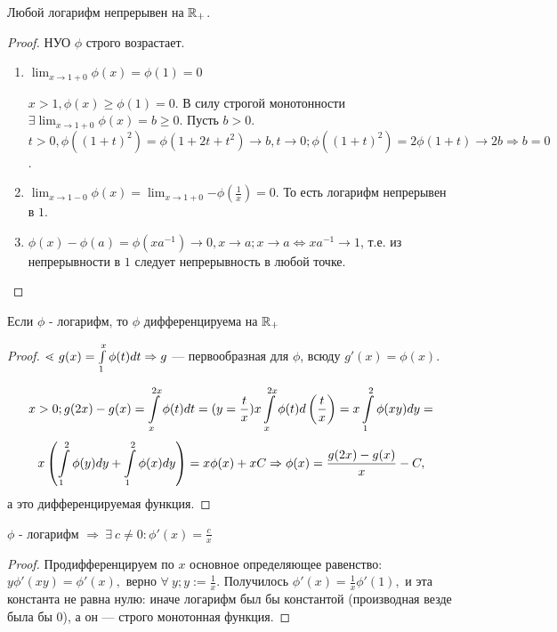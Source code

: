 \documentclass[12pt]{report}
\begin{document}
\begin{lm}
Любой логарифм непрерывен на $\mathbb{R}_{+}$. 
\end{lm}
\begin{proof}
НУО $\phi$ строго возрастает. 
\begin{enumerate}
\item $\lim_{x \to 1 + 0}{\phi(x)} = \phi(1) = 0$

$x > 1, \phi(x) \ge \phi(1) = 0$. В силу строгой монотонности $\exists \lim_{x \to 1 + 0}{\phi(x)} = b \ge 0$. Пусть $b > 0$. $t > 0, \phi((1 + t)^2) = \phi(1 + 2t + t^2) \to b, t \to 0; \phi((1 + t)^2) = 2\phi(1 + t) \to 2b \Rightarrow b = 0$.

\item $\lim_{x \to 1 - 0}{\phi(x)} = \lim_{x \to 1 + 0}{-\phi(\frac{1}{x})} = 0$. То есть логарифм непрерывен в $1$.

\item $\phi(x) - \phi(a) = \phi(x a^{-1}) \to 0, x \to a; x \to a \Leftrightarrow xa^{-1} \to 1$, т.е. из непрерывности в $1$ следует непрерывность в любой точке.
\end{enumerate}
\end{proof}

\begin{lm}[2]
Если $\phi$ - логарифм, то $\phi$ дифференцируема на $\mathbb{R}_{+}$
\end{lm}
\begin{proof}
$\lessdot ~g(x) = \int\limits_1^x{\phi(t)dt} \Rightarrow g$ --- первообразная для $\phi$, всюду $g'(x) = \phi(x)$.

$$x > 0; g(2x) - g(x) = \int\limits_x^{2x}{\phi(t)dt} = (y = \frac{t}{x}) x\int\limits_x^{2x}{\phi(t)d\left(\frac{t}{x}\right)} = x\int\limits_1^2{\phi(xy)dy} = $$ $$x\left(\int\limits_1^2{\phi(y)dy} + \int\limits_1^2{\phi(x)dy}\right) = x\phi(x) + xC \Rightarrow \phi(x) = \frac{g(2x) - g(x)}{x} - C,$$
а это дифференцируемая функция.
\end{proof}

\begin{lm}[3]
$\phi$ - логарифм $\Rightarrow ~\exists ~c \neq 0: \phi'(x) =  \frac{c}{x}$
\end{lm}
\begin{proof}
Продифференцируем по $x$ основное определяющее равенство:
$y \phi'(xy) = \phi'(x),$ верно $\forall ~y; y := \frac{1}{x}$. Получилось $\phi'(x) = \frac{1}{x}\phi'(1),$ и эта константа не равна нулю: иначе логарифм был бы константой (производная везде была бы $0$), а он --- строго монотонная функция.
\end{proof}
\end{document}
